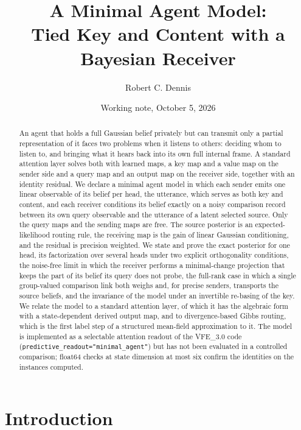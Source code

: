 \documentclass[11pt]{article}
\title{A Minimal Agent Model:\\Tied Key and Content with a Bayesian Receiver}
\author{Robert C. Dennis}
\date{Working note, October 5, 2026}
\theoremstyle{definition}
\theoremstyle{remark}
\begin{document}
\maketitle

\begin{abstract}
An agent that holds a full Gaussian belief privately but can transmit only a partial representation of it faces two problems when it listens to others: deciding whom to listen to, and bringing what it hears back into its own full internal frame. A standard attention layer solves both with learned maps, a key map and a value map on the sender side and a query map and an output map on the receiver side, together with an identity residual. We declare a minimal agent model in which each sender emits one linear observable of its belief per head, the utterance, which serves as both key and content, and each receiver conditions its belief exactly on a noisy comparison record between its own query observable and the utterance of a latent selected source. Only the query maps and the sending maps are free. The source posterior is an expected-likelihood routing rule, the receiving map is the gain of linear Gaussian conditioning, and the residual is precision weighted. We state and prove the exact posterior for one head, its factorization over several heads under two explicit orthogonality conditions, the noise-free limit in which the receiver performs a minimal-change projection that keeps the part of its belief its query does not probe, the full-rank case in which a single group-valued comparison link both weighs and, for precise senders, transports the source beliefs, and the invariance of the model under an invertible re-basing of the key. We relate the model to a standard attention layer, of which it has the algebraic form with a state-dependent derived output map, and to divergence-based Gibbs routing, which is the first label step of a structured mean-field approximation to it. The model is implemented as a selectable attention readout of the VFE\_3.0 code (\texttt{predictive\_readout="minimal\_agent"}) but has not been evaluated in a controlled comparison; float64 checks at state dimension at most six confirm the identities on the instances computed.
\end{abstract}

\section{Introduction}
\label{ma:sec:intro}
\end{document}

